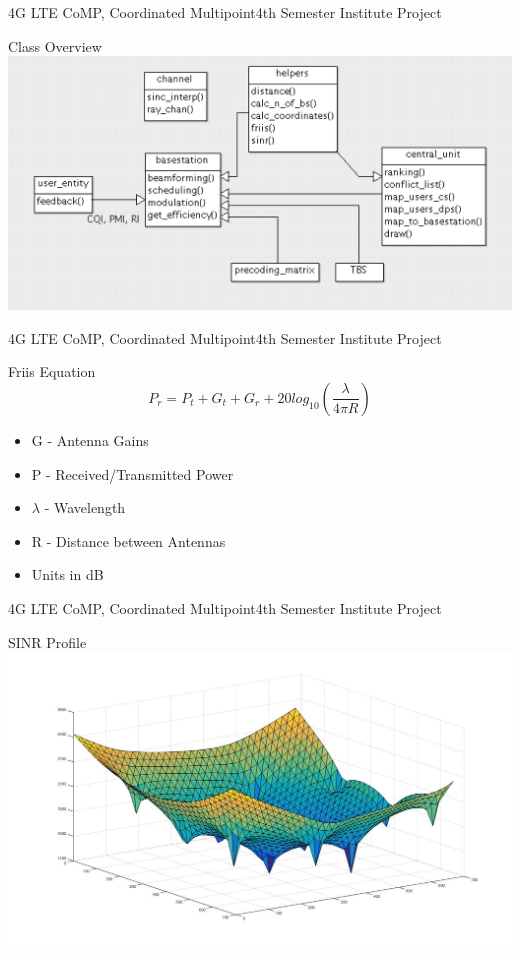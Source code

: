 \documentclass[xcolor={cmyk}]{beamer}
\begin{document}
  \begin{frame}{4G LTE CoMP, Coordinated Multipoint}{4th Semester Institute Project}
	 \begin{block}{Class Overview}
		 \includegraphics[width=\linewidth,height=\textheight,keepaspectratio]{klassen.png}
	 \end{block}
 \end{frame}

  \begin{frame}{4G LTE CoMP, Coordinated Multipoint}{4th Semester Institute Project}
	 \begin{block}{Friis Equation}
		\begin{equation*}
			P_r = P_t + G_t + G_r + 20 log_{10}(\frac{\lambda}{4 \pi R})
		\end{equation*}
		\begin{itemize}
			\item G - Antenna Gains
			\item P - Received/Transmitted Power
			\item $\lambda$ - Wavelength
			\item R - Distance between Antennas
			\item Units in dB
		\end{itemize}
	 \end{block}
 \end{frame}

  \begin{frame}{4G LTE CoMP, Coordinated Multipoint}{4th Semester Institute Project}
	 \begin{block}{SINR Profile}
		 \includegraphics[width=\linewidth,height=\textheight,keepaspectratio]{sinr.jpg}
	 \end{block}
 \end{frame}
 
\end{document}
